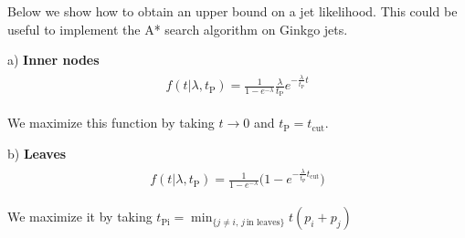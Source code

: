 \documentclass[12pt]{article}
\newcommand{\bea}{\begin{eqnarray}\begin{aligned}}
\newcommand{\eea}{\end{aligned}\end{eqnarray}}
\begin{document}
Below we show how to obtain an upper bound on a jet likelihood. This could be useful to implement the A* search algorithm on Ginkgo jets.

a) \textbf{Inner nodes}
\bea
 f(t | \lambda, t_{\text{P}})=\frac{1}{1-e^{- \lambda}} \frac{\lambda}{t_{\text{P}}} e^{- \frac{\lambda}{ t_{\text{P}}} t} 
\eea

We maximize this function by taking $t \rightarrow 0$ and $t_{\text{P}} = t_{\text{cut}}$.

b) \textbf{Leaves}
\bea
 f(t | \lambda, t_{\text{P}})=\frac{1}{1-e^{- \lambda}} \bigg(1-e^{- \frac{\lambda}{ t_{\text{P}}} t_{\text{cut}}}\bigg) 
\eea

We maximize it by taking $t_{\text{Pi}} = \min_{\{j \neq i,\, j\, \text{in leaves}\}} t(p_i+p_j)$
\end{document}
